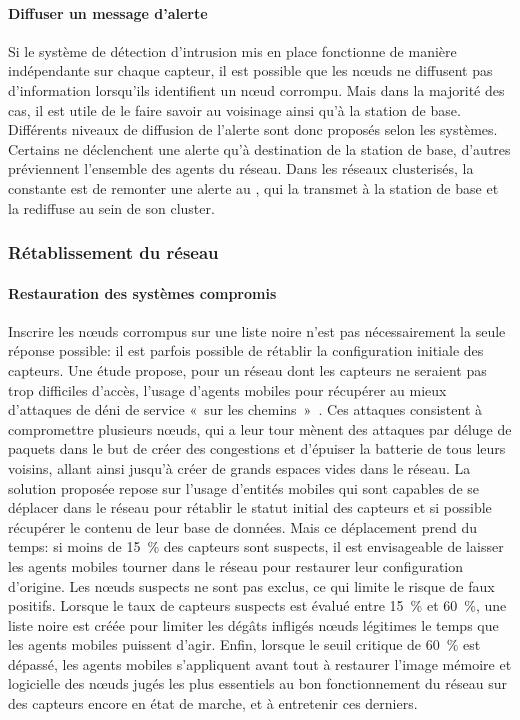         \paragraph{Diffuser un message d'alerte}
Si le système de détection d'intrusion mis en place fonctionne de manière indépendante sur chaque capteur, il est possible que les nœuds ne diffusent pas d'information lorsqu'ils identifient un nœud corrompu.
Mais dans la majorité des cas, il est utile de le faire savoir au voisinage ainsi qu'à la station de base.
Différents niveaux de diffusion de l'alerte sont donc proposés selon les systèmes.
Certains ne déclenchent une alerte qu'à destination de la station de base, d'autres préviennent l'ensemble des agents du réseau.
Dans les réseaux clusterisés, la constante est de remonter une alerte au \ch, qui la transmet à la station de base et la rediffuse au sein de son cluster.

    \subsubsection{Rétablissement du réseau}
        \paragraph{Restauration des systèmes compromis}
Inscrire les nœuds corrompus sur une liste noire n'est pas nécessairement la seule réponse possible: il est parfois possible de rétablir la configuration initiale des capteurs.
Une étude propose, pour un réseau dont les capteurs ne seraient pas trop difficiles d'accès, l'usage d'agents mobiles pour récupérer au mieux d'attaques de déni de service « sur les chemins »~\cite{LB09}.
Ces attaques consistent à compromettre plusieurs nœuds, qui a leur tour mènent des attaques par déluge de paquets dans le but de créer des congestions et d'épuiser la batterie de tous leurs voisins, allant ainsi jusqu'à créer de grands espaces vides dans le réseau.
La solution proposée repose sur l'usage d'entités mobiles qui sont capables de se déplacer dans le réseau pour rétablir le statut initial des capteurs et si possible récupérer le contenu de leur base de données.
Mais ce déplacement prend du temps: si moins de 15~\% des capteurs sont suspects, il est envisageable de laisser les agents mobiles tourner dans le réseau pour restaurer leur configuration d'origine.
Les nœuds suspects ne sont pas exclus, ce qui limite le risque de faux positifs.
Lorsque le taux de capteurs suspects est évalué entre 15~\% et 60~\%, une liste noire est créée pour limiter les dégâts infligés nœuds légitimes le temps que les agents mobiles puissent d'agir.
Enfin, lorsque le seuil critique de 60~\% est dépassé, les agents mobiles s'appliquent avant tout à restaurer l'image mémoire et logicielle des nœuds jugés les plus essentiels au bon fonctionnement du réseau sur des capteurs encore en état de marche, et à entretenir ces derniers.

